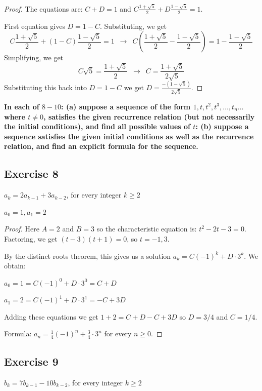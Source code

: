 \documentclass[14pt]{extarticle}
\newcommand{\dps}{\displaystyle}
\newcommand{\cy}{\color{cyan}}
\begin{document}
\begin{proof}
The equations are: \(C + D = 1\) and \(\dps C \frac{1 + \sqrt{5}}{2} + D \frac{1 - \sqrt{5}}{2} = 1\).

First equation gives $D = 1 - C$. Substituting, we get
\[
C \frac{1 + \sqrt{5}}{2} + (1-C) \frac{1 - \sqrt{5}}{2} = 1 \,\,\, \to \,\,\, 
C\left(\frac{1 + \sqrt{5}}{2} - \frac{1 - \sqrt{5}}{2}\right) = 1 - \frac{1 - \sqrt{5}}{2}
\]
Simplifying, we get
\[
C \sqrt{5} = \frac{1 + \sqrt{5}}{2} \,\,\, \to \,\,\, 
C = \frac{1 + \sqrt{5}}{2 \sqrt{5}}
\]
Substituting this back into $D = 1 - C$ we get \(\dps D = \frac{-(1 - \sqrt{5})}{2 \sqrt{5}}\).
\end{proof}

{\bf \cy In each of $8-10$: (a) suppose a sequence of the form \(1, t, t^2, t^3, \ldots, t_n \ldots\) where 
\(t \neq 0\), satisfies the given recurrence relation (but not necessarily the initial conditions), and find all 
possible values of $t$: (b) suppose a sequence satisfies the given initial conditions as well as the recurrence 
relation, and find an explicit formula for the sequence.}

\subsection{Exercise 8}
\(a_k = 2a_{k-1} + 3a_{k-2}\), for every integer \(k \geq 2\)

\(a_0 = 1, a_1 = 2\)

\begin{proof}
Here $A = 2$ and $B = 3$ so the characteristic equation is: \(t^2 - 2t - 3 = 0\). 
Factoring, we get \((t - 3)(t+1) = 0\), so $t = -1, 3$.

By the distinct roots theorem, this gives us a solution \(a_k = C(-1)^k + D \cdot 3^k\). We obtain:

\(a_0 = 1 = C(-1)^0 + D \cdot 3^0 = C + D\)

\(a_1 = 2 = C(-1)^1 + D \cdot 3^1 = -C + 3D\)

Adding these equations we get \(1 + 2 = C + D - C + 3D\) so $D = 3/4$ and $C = 1/4$.

Formula: \(a_n = \frac{1}{4}(-1)^n + \frac{3}{4} \cdot 3^n\) for every \(n \geq 0\).
\end{proof}

\subsection{Exercise 9}
\(b_k = 7b_{k-1} - 10b_{k-2}\), for every integer \(k \geq 2\)
\end{document}
